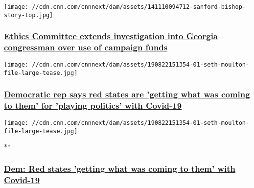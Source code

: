 \href{/2020/07/31/politics/house-ethics-investigation-sanford-bishop/index.html}{}

\texttt{[image: //cdn.cnn.com/cnnnext/dam/assets/141110094712-sanford-bishop-story-top.jpg]}

\hypertarget{ethics-committee-extends-investigation-into-georgia-congressman-over-use-of-campaign-funds}{%
\subsubsection{\texorpdfstring{\href{/2020/07/31/politics/house-ethics-investigation-sanford-bishop/index.html}{Ethics
Committee extends investigation into Georgia congressman over use of
campaign
funds}}{Ethics Committee extends investigation into Georgia congressman over use of campaign funds}}\label{ethics-committee-extends-investigation-into-georgia-congressman-over-use-of-campaign-funds}}

\href{/2020/07/31/politics/seth-moulton-red-states-playing-politics-covid/index.html}{}

\texttt{[image: //cdn.cnn.com/cnnnext/dam/assets/190822151354-01-seth-moulton-file-large-tease.jpg]}

\hypertarget{democratic-rep-says-red-states-are-getting-what-was-coming-to-them-for-playing-politics-with-covid-19}{%
\subsubsection{\texorpdfstring{\href{/2020/07/31/politics/seth-moulton-red-states-playing-politics-covid/index.html}{Democratic
rep says red states are 'getting what was coming to them' for 'playing
politics' with
Covid-19}}{Democratic rep says red states are 'getting what was coming to them' for 'playing politics' with Covid-19}}\label{democratic-rep-says-red-states-are-getting-what-was-coming-to-them-for-playing-politics-with-covid-19}}

\href{/videos/politics/2020/08/01/seth-moulton-red-states-covid-jm-orig.cnn}{}

\texttt{[image: //cdn.cnn.com/cnnnext/dam/assets/190822151354-01-seth-moulton-file-large-tease.jpg]}

**

\hypertarget{dem-red-states-getting-what-was-coming-to-them-with-covid-19}{%
\subsubsection{\texorpdfstring{\href{/videos/politics/2020/08/01/seth-moulton-red-states-covid-jm-orig.cnn}{Dem:
Red states 'getting what was coming to them' with
Covid-19}}{Dem: Red states 'getting what was coming to them' with Covid-19}}\label{dem-red-states-getting-what-was-coming-to-them-with-covid-19}}

